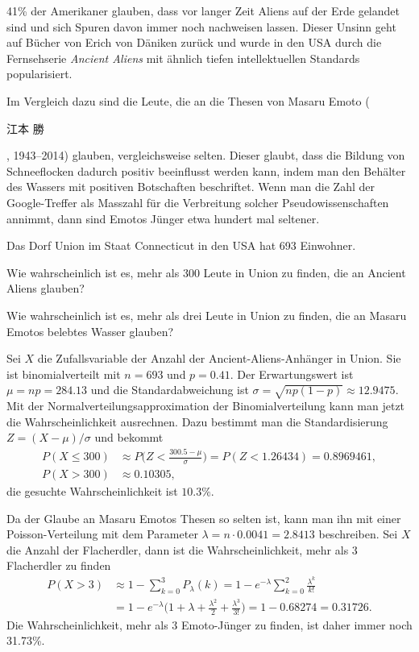 41\% der Amerikaner glauben, dass vor langer Zeit Aliens auf der
Erde gelandet sind und sich Spuren davon immer noch nachweisen lassen.
Dieser Unsinn geht auf Bücher von Erich von Däniken zurück und wurde
in den USA durch die Fernsehserie {\em Ancient Aliens}
mit ähnlich tiefen intellektuellen Standards popularisiert.

Im Vergleich dazu sind die Leute, die an die Thesen von Masaru Emoto
(\begin{CJK}{UTF8}{min}江本 勝\end{CJK}, 1943--2014) glauben,
vergleichsweise selten.
Dieser glaubt, dass die Bildung von Schneeflocken dadurch positiv
beeinflusst werden kann, indem man den Behälter des Wassers mit
positiven Botschaften beschriftet.
Wenn man die Zahl der Google-Treffer als Masszahl für die Verbreitung
solcher Pseudowissenschaften annimmt, dann sind Emotos Jünger etwa
hundert mal seltener.

Das Dorf Union im Staat Connecticut in den USA hat 693 Einwohner.
\begin{teilaufgaben}
\item
Wie wahrscheinlich ist es, mehr als 300 Leute in Union zu finden,
die an Ancient Aliens glauben?
\item
Wie wahrscheinlich ist es, mehr als drei Leute in Union zu finden,
die an Masaru Emotos belebtes Wasser glauben?
\end{teilaufgaben}

\begin{loesung}
\begin{teilaufgaben}
\item
Sei $X$ die Zufallsvariable der Anzahl der Ancient-Aliens-Anhänger in Union.
Sie ist binomialverteilt mit $n=693$ und $p=0.41$.
Der Erwartungswert ist $\mu=np=284.13$ und die Standardabweichung
ist $\sigma=\sqrt{np(1-p)}\approx 12.9475$.
Mit der Normalverteilungsapproximation der Binomialverteilung
kann man jetzt die Wahrscheinlichkeit ausrechnen.
Dazu bestimmt man die Standardisierung $Z=(X-\mu)/\sigma$ und
bekommt
\begin{align*}
P(X\le 300)
&\approx
P\biggl(Z < \frac{300.5-\mu}{\sigma}\biggr)
=
P(Z < 1.26434) = 0.8969461,
\\
P(X>300)
&\approx 0.10305,
\end{align*}
die gesuchte Wahrscheinlichkeit ist $10.3\%$.
\item
Da der Glaube an Masaru Emotos Thesen so selten ist, kann man ihn
mit einer
Poisson-Verteilung mit dem Parameter $\lambda = n\cdot 0.0041=2.8413$
beschreiben.
Sei $X$ die Anzahl der Flacherdler, dann ist die Wahrscheinlichkeit,
mehr als 3 Flacherdler zu finden
\begin{align*}
P(X>3)
&\approx
1-\sum_{k=0}^3 P_\lambda(k)
=
1-e^{-\lambda} \sum_{k=0}^2 \frac{\lambda^k}{k!}
\\
&=
1-e^{-\lambda}\biggl(1+\lambda+\frac{\lambda^2}{2}+\frac{\lambda^3}{3!}\biggr)
=
1- 0.68274
=
0.31726.
\end{align*}
Die Wahrscheinlichkeit, mehr als 3 Emoto-Jünger zu finden, ist daher 
immer noch 31.73\%.
\qedhere
\end{teilaufgaben}
\end{loesung}

